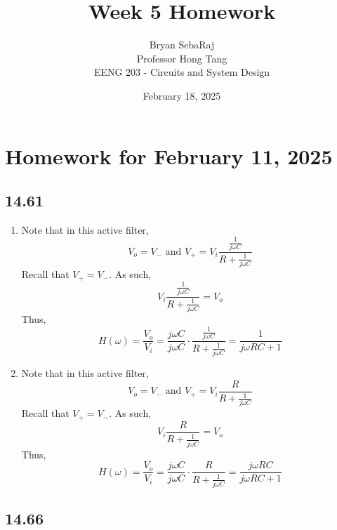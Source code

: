 \documentclass{article}
\title{Week 5 Homework}
\author{Bryan SebaRaj \\[0.7em] Professor Hong Tang \\[0.7em]  EENG 203 - Circuits and System Design}
\date{February 18, 2025}
\begin{document}
\maketitle

\section*{Homework for February 11, 2025}

\subsection*{14.61}

\begin{enumerate}[label=(\alph*)]
    \item Note that in this active filter, $$V_o=V_- \text{ and } V_+=
        V_i \frac{\frac{1}{j\omega C}}{R+\frac{1}{j \omega C}}$$
        Recall that $V_+=V_-$. As such, 
        $$V_i \frac{\frac{1}{j\omega C}}{R+\frac{1}{j \omega C}}=V_o$$
        Thus, $$H(\omega)=\frac{V_o}{V_i}=\frac{j\omega C}{j\omega C}\cdot \frac{\frac{1}{j\omega C}}{R+\frac{1}{j \omega C}}=\frac{1}{j\omega RC + 1}$$
    \item Note that in this active filter, $$V_o=V_- \text{ and } V_+=V_i\frac{R}{R + \frac{1}{j\omega C}}$$
        Recall that $V_+=V_-$. As such,
        $$V_i\frac{R}{R + \frac{1}{j\omega C}}=V_o$$
        Thus, $$H(\omega)=\frac{V_o}{V_i}=\frac{j\omega C}{j \omega C} \cdot \frac{R}{R + \frac{1}{j\omega C}}=\frac{j\omega RC}{j\omega RC + 1}$$
\end{enumerate}


\subsection*{14.66}
\end{document}
